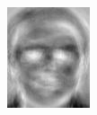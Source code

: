\begin{frame}
\begin{columns}
\begin{overlayarea}{\textwidth}{\textheight}
{\begin{minipage}[t]{0.15\textwidth}
          \includegraphics[width=\textwidth]{images/eig_docked_image/eig_11.jpeg}
        \end{minipage}
        \begin{minipage}[t]{0.15\textwidth}

\end{minipage}}
\end{overlayarea}
\end{columns}
\end{frame}
